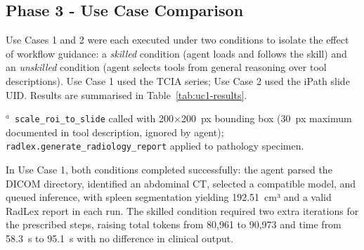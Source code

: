 \documentclass[preprint,12pt]{elsarticle}
\begin{document}
\subsection{Phase 3  -  Use Case Comparison}
Use Cases 1 and 2 were each executed under two conditions to isolate the effect of workflow guidance: a \emph{skilled} condition (agent loads and follows the skill) and an \emph{unskilled} condition (agent selects tools from general reasoning over tool descriptions). Use Case 1 used the TCIA series; Use Case 2 used the iPath slide UID. Results are summarised in Table~\ref{tab:uc1-results}.

\begin{table}[H]
  \caption{Use Cases 1 and 2: Execution Metrics and Outcomes}
  \label{tab:uc1-results}
  \centering
  \par\smallskip
  \raggedright\footnotesize
  $^{a}$~\texttt{scale\_roi\_to\_slide} called with 200$\times$200~px bounding box (30~px maximum documented in tool description, ignored by agent); \texttt{radlex.generate\_radiology\_report} applied to pathology specimen.
\end{table}

In Use Case 1, both conditions completed successfully: the agent parsed the DICOM directory, identified an abdominal CT, selected a compatible model, and queued inference, with spleen segmentation yielding 192.51~cm³ and a valid RadLex report in each run. The skilled condition required two extra iterations for the prescribed steps, raising total tokens from 80{,}961 to 90{,}973 and time from 58.3~s to 95.1~s with no difference in clinical output.
\end{document}
